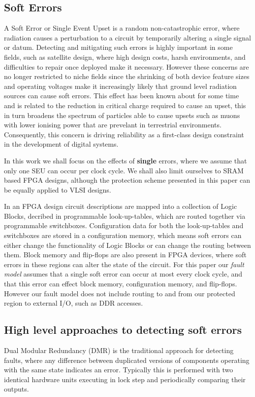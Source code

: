 \subsection{Soft Errors}
A Soft Error or Single Event Upset is a random non-catastrophic error, where radiation causes
a perturbation to a circuit by temporarily altering a single signal or datum. 
Detecting and mitigating such errors is highly important in some fields, such as satellite design, 
where high design costs, harsh environments, and difficulties to repair once deployed make it necessary. 
However these concerns are no longer restricted to niche fields
since the shrinking of both device feature sizes and operating voltages make it increasingly likely 
that ground level radiation sources can cause soft errors.
This effect has been known about for some time \cite{normand1996single} and is related to 
the reduction in critical charge required to cause an upset, this in turn broadens the spectrum of
particles able to cause upsets such as muons with lower ionising power that are prevelant in terrestrial
environments.
Consequently, this concern is driving reliability as a first-class design constraint in the 
development of digital systems.

In this work we shall focus on the effects of \textbf{single} errors, where we assume that only one SEU 
can occur per clock cycle.
We shall also limit ourselves to SRAM based FPGA designs, although the protection scheme 
presented in this paper can be equally applied to VLSI designs.

In an FPGA design circuit descriptions are mapped into a collection of Logic Blocks, decribed in programmable look-up-tables,
which are routed together via programmable switchboxes.
Configuration data for both the look-up-tables and switchboxes are stored in a configuration memory, which means soft errors
can either change the functionality of Logic Blocks or can change the routing between them.  
Block memory and flip-flops are also present in FPGA devices, where soft errors in these regions can alter the state of the circuit.
For this paper our \emph{fault model} assumes that a single soft error can occur at most every clock cycle, and that this error can effect block memory, configuration memory, and flip-flops. 
However our fault model does not include routing to and from our protected region to external I/O, such as DDR accesses.

\subsection{High level approaches to detecting soft errors}
Dual Modular Redundancy (DMR) is the traditional approach for detecting faults,
where any difference between duplicated versions of components operating with the same state indicates 
an error.
Typically this is performed with two identical hardware units executing in lock step and
periodically comparing their outputs.

